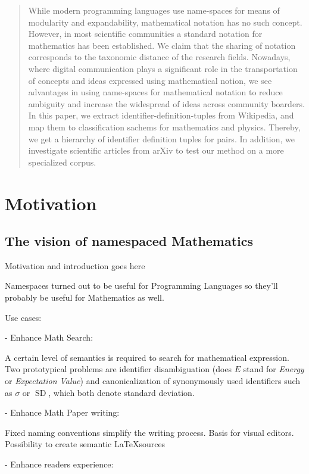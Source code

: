 \documentclass{sig-alternate-2013}
\begin{document}
\begin{abstract}
While modern programming languages use name-spaces for means of modularity and expandability, mathematical notation has no such concept.
However, in most scientific communities a standard notation for mathematics has been established.
We claim that the sharing of notation corresponds to the taxonomic distance of the research fields.
Nowadays, where digital communication plays a significant role in the transportation of concepts and ideas expressed using mathematical notion, we see advantages in using name-spaces for mathematical notation to reduce ambiguity and increase the widespread of ideas across community boarders.
In this paper, we extract identifier-definition-tuples from Wikipedia, and map them to classification sachems for mathematics and physics. Thereby, we get a hierarchy of identifier definition tuples for pairs.
In addition, we investigate scientific articles from arXiv to test our method on a more specialized corpus.
\end{abstract}







\section{Motivation}
\subsection{The vision of namespaced Mathematics}
Motivation and introduction goes here


Namespaces turned out to be useful for Programming Languages so they'll probably be useful for Mathematics as well.

Use cases:

- Enhance Math Search:

A certain level of semantics is required to search for mathematical expression. Two prototypical problems are identifier disambiguation (does $E$ stand for \emph{Energy} or \emph{Expectation Value}) and canonicalization of synonymously used identifiers such as $\sigma$ or $\operatorname{SD}$, which both denote standard deviation. 

- Enhance Math Paper writing:

Fixed naming conventions simplify the writing process.
Basis for visual editors.
Possibility to create semantic \LaTeX sources

- Enhance readers experience:
\end{document}
